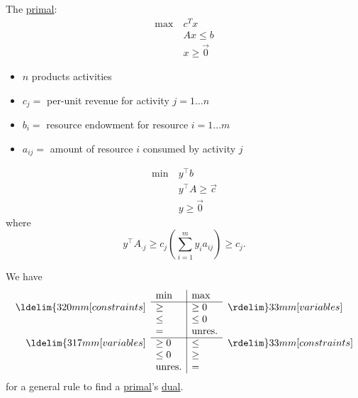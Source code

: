 \begin{prev}
	The \hyperref[def:primal]{primal}:
	\begin{align*}
		\max~ & c^Tx          \\
		      & Ax \leq b     \\
		      & x\geq \vec{0}
	\end{align*}
	\begin{itemize}
		\item \(n\) products activities
		\item \(c_{j}=\) per-unit revenue for activity \(j = 1\ldots n\)
		\item \(b_{i}=\) resource endowment for resource \(i = 1\ldots m\)
		\item \(a_{ij}=\) amount of resource \(i\) consumed by activity \(j\)
	\end{itemize}
	\begin{align*}
		\min~ & y^{\top}b               \\
		      & y^{\top} A\geq  \vec{c} \\
		      & y\geq \vec{0}
	\end{align*}
	where \[
		y^{\top}A_{\cdot j}\geq c_{j}(\sum\limits_{i=1}^{m} y_{i}a_{ij}) \geq c_{j}.
	\]
\end{prev}

\begin{note}
	We have
	\[
		\begin{array}{rl|ll}

			                                & \min          & \max          &                                \\
			\cline{2-3}
			\ldelim\{{3}{20mm}[constraints] & \geq          & \geq 0        & \rdelim\}{3}{3mm}[variables]   \\
			                                & \leq          & \leq 0        &                                \\
			                                & =             & \mbox{unres.} &                                \\
			\cline{2-3}
			\ldelim\{{3}{17mm}[variables]   & \geq 0        & \leq          & \rdelim\}{3}{3mm}[constraints] \\
			                                & \leq 0        & \geq          &                                \\
			                                & \mbox{unres.} & =             &                                \\
		\end{array}
	\]
	for a general rule to find a \hyperref[def:primal]{primal}'s \hyperref[def:dual]{dual}.
\end{note}


